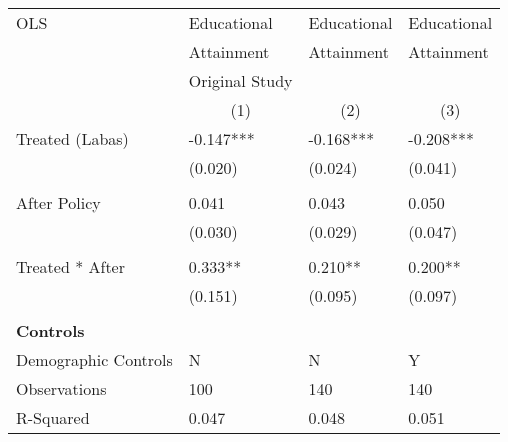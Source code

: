 \begin{tabular}{p{4cm}p{1.5cm}p{1.5cm}p{1.5cm}}
\hline\hline
OLS               &Educational & Educational &Educational \\
&Attainment &Attainment &Attainment \\
&Original Study & &  \\
&\multicolumn{1}{c}{(1)}&\multicolumn{1}{c}{(2)}&\multicolumn{1}{c}{(3)}\\
\hline
Treated (Labas)   &  -0.147***&   -0.168*** & -0.208*** \\
                &  (0.020)&  (0.024) & (0.041)\\
                \\
After Policy   &   0.041&   0.043 &0.050\\
                &  (0.030)&  (0.029) & (0.047)\\
                \\
Treated * After   &  0.333**&  0.210** & 0.200**\\
                &  (0.151)&  (0.095) &(0.097)\\
                \\

\multicolumn{6}{l}{\textbf{Controls}}  \\                  
Demographic Controls       &    N    &       N&        Y\\

\hline
Observations    &    100&    140 & 140\\
R-Squared    &  0.047   & 0.048 & 0.051     \\
\hline\hline
\end{tabular}